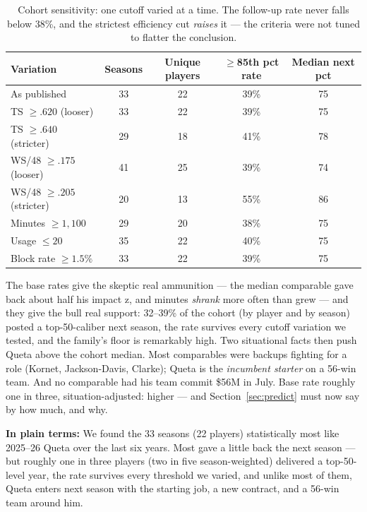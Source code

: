 \documentclass[11pt]{article}
\newcommand{\plainbox}[1]{\par\medskip\noindent\begin{center}%
\colorbox{court!8}{\parbox{0.93\textwidth}{\small \textbf{\textcolor{court}{In plain terms:}} #1}}%
\end{center}\medskip}
\begin{document}
\begin{table}[h]
\centering\small
\caption{Cohort sensitivity: one cutoff varied at a time. The follow-up rate never
falls below 38\%, and the strictest efficiency cut \emph{raises} it --- the criteria
were not tuned to flatter the conclusion.}
\begin{tabular}{lcccc}
\toprule
Variation & Seasons & Unique players & $\ge$85th pct rate & Median next pct \\
\midrule
As published & 33 & 22 & 39\% & 75 \\
TS $\ge .620$ (looser) & 33 & 22 & 39\% & 75 \\
TS $\ge .640$ (stricter) & 29 & 18 & 41\% & 78 \\
WS/48 $\ge .175$ (looser) & 41 & 25 & 39\% & 74 \\
WS/48 $\ge .205$ (stricter) & 20 & 13 & 55\% & 86 \\
Minutes $\ge 1{,}100$ & 29 & 20 & 38\% & 75 \\
Usage $\le 20$ & 35 & 22 & 40\% & 75 \\
Block rate $\ge 1.5\%$ & 33 & 22 & 39\% & 75 \\
\bottomrule
\end{tabular}
\label{tab:sens}
\end{table}

The base rates give the skeptic real ammunition --- the median comparable gave back
about half his impact z, and minutes \emph{shrank} more often than grew --- and they
give the bull real support: 32--39\% of the cohort (by player and by season) posted a
top-50-caliber next season, the rate survives every cutoff variation we tested, and
the family's floor is remarkably high. Two situational facts then push Queta above the
cohort median. Most comparables were backups fighting for a role (Kornet,
Jackson-Davis, Clarke); Queta is the \emph{incumbent starter} on a 56-win team. And no
comparable had his team commit \$56M in July. Base rate roughly one in three,
situation-adjusted: higher --- and Section~\ref{sec:predict} must now say by how much,
and why.

\plainbox{We found the 33 seasons (22 players) statistically most like 2025--26 Queta
over the last six years. Most gave a little back the next season --- but roughly one in
three players (two in five season-weighted) delivered a top-50-level year, the rate
survives every threshold we varied, and unlike most of them, Queta enters next season
with the starting job, a new contract, and a 56-win team around him.}
\end{document}

